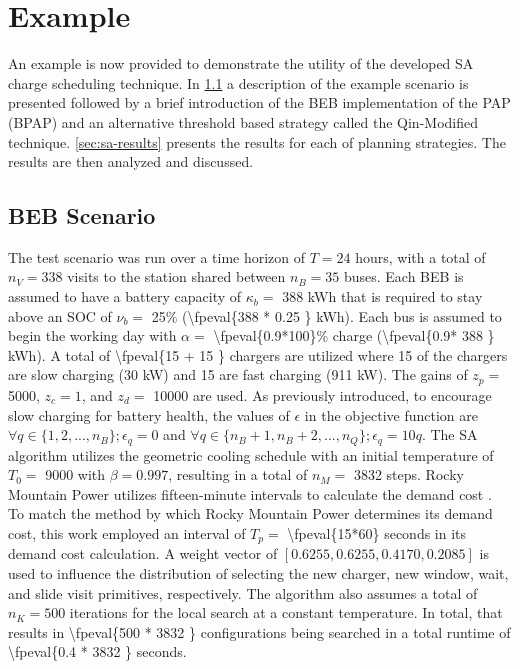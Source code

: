 \documentclass[energies,article,submit,moreauthors]{Definitions/mdpi}
\newcommand{\A}{35 }                                                            %
\newcommand{\N}{338 }                                                           %
\newcommand{\Cgain}{5000}                                                       %
\newcommand{\acharge}{0.9}                                                      %
\newcommand{\mincharge}{25\% }                                                  %
\newcommand{\minchargeD}{0.25 }                                                 %
\newcommand{\batsize}{388 }                                                     %
\newcommand{\fast}{15 }                                                         %
\newcommand{\slow}{15 }                                                         %
\newcommand{\fasts}{911 }                                                       %
\newcommand{\slows}{30 }                                                        %
\newcommand{\localcnt}{500 }                                                    %
\newcommand{\tempinit}{9000 }                                                   %
\newcommand{\tempcnt}{3832 }                                                    %
\newcommand{\quicklocal}{0.4 }                                                  %
\begin{document}
\section{Example}
\label{sec:sa-example}
An example is now provided to demonstrate the utility of the developed SA charge scheduling technique. In
\ref{sec:sa-beb-scenario} a description of the example scenario is presented followed by a brief introduction of the BEB
implementation of the PAP (BPAP) and an alternative threshold based strategy called the Qin-Modified technique.
\ref{sec:sa-results} presents the results for each of planning strategies. The results are then analyzed and discussed.

\subsection{BEB Scenario}
\label{sec:sa-beb-scenario}
The test scenario was run over a time horizon of \(T=24\) hours, with a total of \(n_V = \N\) visits to the station shared
between \(n_B = \A\) buses. Each BEB is assumed to have a battery capacity of \(\kappa_b =\) \batsize kWh that is required to
stay above an SOC of \(\nu_b =\) \mincharge (\num{\fpeval{\batsize * \minchargeD}} kWh). Each bus is assumed to
begin the working day with \(\alpha =\) \num{\fpeval{\acharge*100}}\% charge (\num{\fpeval{\acharge * \batsize}} kWh). A total of \num{\fpeval{\fast + \slow}} chargers are utilized where \slow of the chargers
are slow charging (\slows kW) and \fast are fast charging (\fasts kW). The gains of \(z_p =\) \num{\Cgain},
\(z_c = 1\), and \(z_d =\) \num{10000} are used. As previously introduced, to encourage slow charging for battery
health, the values of \(\epsilon\) in the objective function are \(\forall q \in \{1,2,..., n_B \}; \epsilon_q = 0\) and \(\forall q \in \{n_B + 1, n_B +
2, ..., n_Q\}; \epsilon_q = 10q\). The SA algorithm utilizes the geometric cooling schedule with an initial temperature of \(T_0
=\) \num{\tempinit} with \(\beta = 0.997\), resulting in a total of \(n_M =\) \num{\tempcnt} steps. Rocky
Mountain Power utilizes fifteen-minute intervals to calculate the demand cost \cite{rocky-mountain-power}. To match the
method by which Rocky Mountain Power determines its demand cost, this work employed an interval of \(T_p =\)
\num{\fpeval{15*60}} seconds in its demand cost calculation. A weight vector of \([0.6255, 0.6255, 0.4170,
0.2085]\) is used to influence the distribution of selecting the new charger, new window, wait, and slide visit
primitives, respectively. The algorithm also assumes a total of \(n_K = \localcnt\) iterations for the local search at a
constant temperature. In total, that results in \num{\fpeval{\localcnt * \tempcnt}} configurations being
searched in a total runtime of \num{\fpeval{\quicklocal * \tempcnt}} seconds.
\end{document}
